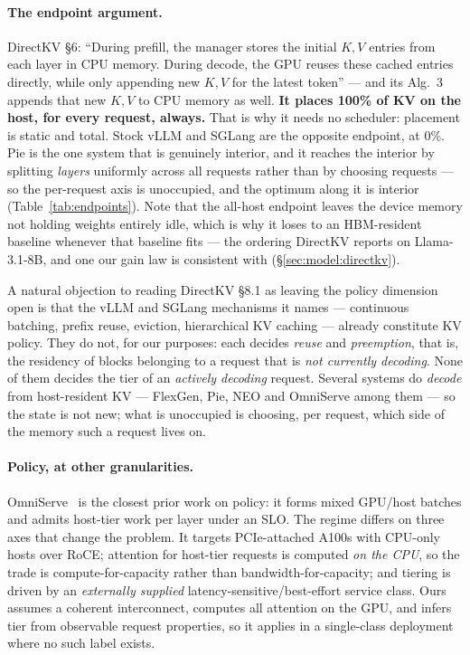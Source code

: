 \paragraph{The endpoint argument.} DirectKV \S6: ``During prefill, the manager
stores the initial $K,V$ entries from each layer in CPU memory. During decode,
the GPU reuses these cached entries directly, while only appending new $K,V$
for the latest token'' --- and its Alg.~3 appends that new $K,V$ to CPU memory
as well. \textbf{It places 100\% of KV on the host, for every request, always.}
That is why it needs no scheduler: placement is static and total. Stock vLLM
and SGLang are the opposite endpoint, at 0\%. Pie is the one system that is
genuinely interior, and it reaches the interior by splitting \emph{layers}
uniformly across all requests rather than by choosing requests --- so the
per-request axis is unoccupied, and the optimum along it is interior
(Table~\ref{tab:endpoints}). Note that the all-host endpoint leaves the device
memory not holding weights entirely idle, which is why it loses to an
HBM-resident baseline whenever that baseline fits --- the ordering DirectKV
reports on Llama-3.1-8B, and one our gain law is consistent with
(\S\ref{sec:model:directkv}).

A natural objection to reading DirectKV \S8.1 as leaving the policy dimension
open is that the vLLM and SGLang mechanisms it names --- continuous batching,
prefix reuse, eviction, hierarchical KV caching --- already constitute KV
policy. They do not, for our purposes: each decides \emph{reuse} and
\emph{preemption}, that is, the residency of blocks belonging to a request that
is \emph{not currently decoding}. None of them decides the tier of an
\emph{actively decoding} request. Several systems do \emph{decode} from
host-resident KV --- FlexGen, Pie, NEO and OmniServe among them --- so the state
is not new; what is unoccupied is choosing, per request, which side of the
memory such a request lives on.

\paragraph{Policy, at other granularities.} OmniServe~\cite{omniserve} is the
closest prior work on policy: it forms mixed GPU/host batches and admits
host-tier work per layer under an SLO. The regime differs on three axes that
change the problem. It targets PCIe-attached A100s with CPU-only hosts over
RoCE; attention for host-tier requests is computed \emph{on the CPU}, so the
trade is compute-for-capacity rather than bandwidth-for-capacity; and tiering
is driven by an \emph{externally supplied} latency-sensitive/best-effort
service class. Ours assumes a coherent interconnect, computes all attention on
the GPU, and infers tier from observable request properties, so it applies in a
single-class deployment where no such label exists.

